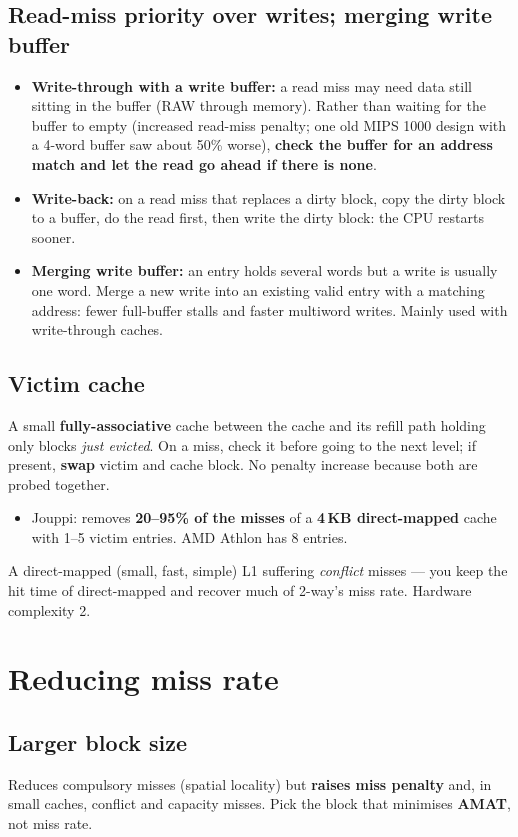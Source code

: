 \subsection{Read-miss priority over writes; merging write buffer}
\begin{itemize}
\item \textbf{Write-through with a write buffer:} a read miss may need data still sitting in the buffer (RAW through memory). Rather than waiting for the buffer to empty (increased read-miss penalty; one old MIPS 1000 design with a 4-word buffer saw about 50\% worse), \textbf{check the buffer for an address match and let the read go ahead if there is none}.
\item \textbf{Write-back:} on a read miss that replaces a dirty block, copy the dirty block to a buffer, do the read first, then write the dirty block: the CPU restarts sooner.
\item \textbf{Merging write buffer:} an entry holds several words but a write is usually one word. Merge a new write into an existing valid entry with a matching address: fewer full-buffer stalls and faster multiword writes. Mainly used with write-through caches.
\end{itemize}

\subsection{Victim cache}
A small \textbf{fully-associative} cache between the cache and its refill path holding only blocks \emph{just evicted}. On a miss, check it before going to the next level; if present, \textbf{swap} victim and cache block. No penalty increase because both are probed together.
\begin{itemize}
\item Jouppi: removes \textbf{20--95\% of the misses} of a \textbf{4\,KB direct-mapped} cache with 1--5 victim entries. AMD Athlon has 8 entries.
\end{itemize}
\begin{pick}
A direct-mapped (small, fast, simple) L1 suffering \emph{conflict} misses --- you keep the hit time of direct-mapped and recover much of 2-way's miss rate. Hardware complexity 2.
\end{pick}

\section{Reducing miss rate}
\subsection{Larger block size}
Reduces compulsory misses (spatial locality) but \textbf{raises miss penalty} and, in small caches, conflict and capacity misses. Pick the block that minimises \textbf{AMAT}, not miss rate.

